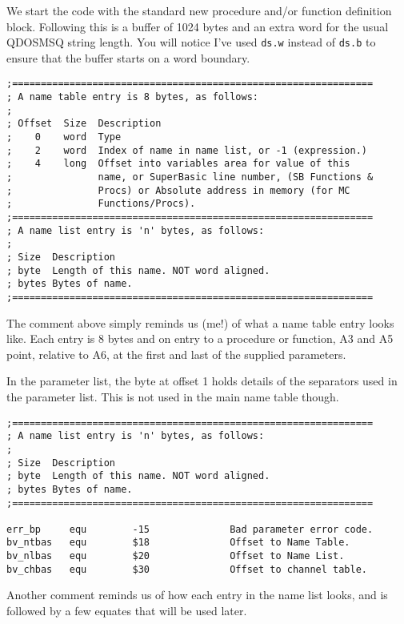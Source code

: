We start the code with the standard new procedure and/or function definition block. Following this is a buffer of 1024 bytes and an extra word for the usual QDOSMSQ string length. You will notice I've used \texttt{ds.w} instead of \texttt{ds.b} to ensure that the buffer starts on a word boundary.

\begin{lstlisting}[firstnumber=last,caption={GetName - Name Table \& Name List Definition}]
;===============================================================
; A name table entry is 8 bytes, as follows:
;
; Offset  Size  Description
;    0    word  Type
;    2    word  Index of name in name list, or -1 (expression.)
;    4    long  Offset into variables area for value of this 
;               name, or SuperBasic line number, (SB Functions &
;               Procs) or Absolute address in memory (for MC
;               Functions/Procs).
;===============================================================
; A name list entry is 'n' bytes, as follows:
;
; Size  Description
; byte  Length of this name. NOT word aligned.
; bytes Bytes of name.
;===============================================================
\end{lstlisting}

The comment above simply reminds us (me!) of what a name table entry looks like. Each entry is 8 bytes and on entry to a procedure or function, A3 and A5 point, relative to A6, at the first and last of the supplied parameters.

In the parameter list, the byte at offset 1 holds details of the separators used in the parameter list. This is not used in the main name table though.

\begin{lstlisting}[firstnumber=last,caption={GetName - Equates}]
;===============================================================
; A name list entry is 'n' bytes, as follows:
;
; Size  Description
; byte  Length of this name. NOT word aligned.
; bytes Bytes of name.
;===============================================================

err_bp     equ        -15              Bad parameter error code.
bv_ntbas   equ        $18              Offset to Name Table.
bv_nlbas   equ        $20              Offset to Name List.
bv_chbas   equ        $30              Offset to channel table.
\end{lstlisting}

Another comment reminds us of how each entry in the name list looks, and is followed by a few equates that will be used later.

